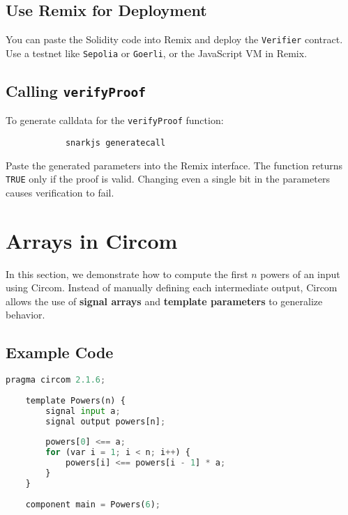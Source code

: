 \documentclass{article}
\begin{document}
	\subsection*{Use Remix for Deployment}
	
	You can paste the Solidity code into Remix and deploy the \texttt{Verifier} contract. Use a testnet like \texttt{Sepolia} or \texttt{Goerli}, or the JavaScript VM in Remix.
	
	\subsection*{Calling \texttt{verifyProof}}
	
	To generate calldata for the \texttt{verifyProof} function:
	
	\begin{tcolorbox}[title=Generate Calldata]
		\begin{lstlisting}
			snarkjs generatecall
		\end{lstlisting}
	\end{tcolorbox}
	
	Paste the generated parameters into the Remix interface. The function returns \texttt{TRUE} only if the proof is valid. Changing even a single bit in the parameters causes verification to fail.
	
\section{Arrays in Circom}

In this section, we demonstrate how to compute the first \( n \) powers of an input using Circom. Instead of manually defining each intermediate output, Circom allows the use of \textbf{signal arrays} and \textbf{template parameters} to generalize behavior.

\subsection*{Example Code}
\begin{lstlisting}[language=Python, caption={Computing powers of input using signal arrays}]
	pragma circom 2.1.6;
	
	template Powers(n) {
		signal input a;
		signal output powers[n];
		
		powers[0] <== a;
		for (var i = 1; i < n; i++) {
			powers[i] <== powers[i - 1] * a;
		}
	}
	
	component main = Powers(6);
\end{lstlisting}
\end{document}
